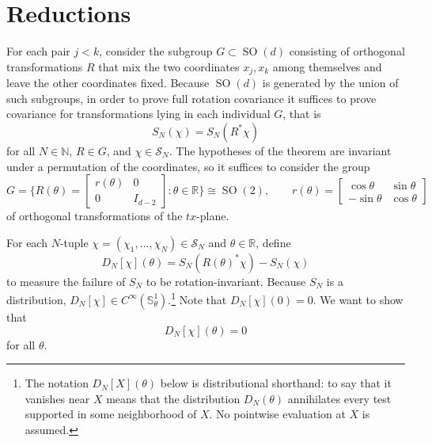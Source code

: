 \documentclass[11pt, letterpaper, reqno]{amsart}
\theoremstyle{definition}
\theoremstyle{remark}
\newcommand{\bbN}{\mathbb{N}}
\newcommand{\bbR}{\mathbb{R}}
\newcommand{\bbS}{\mathbb{S}}
\newcommand{\calS}{\mathcal{S}}
\begin{document}
\section{Reductions}


For each pair $j<k$, consider the subgroup $G\subset \operatorname{SO}(d)$ consisting of orthogonal transformations $R$ that mix the two coordinates $x_j,x_k$ among themselves and leave the other coordinates fixed.
Because $\operatorname{SO}(d)$ is generated by the union of such subgroups, in order to prove full rotation covariance it suffices to prove covariance for transformations lying in each individual $G$, that is
\begin{equation}
    S_N(\chi) = S_N(R^* \chi )
\end{equation}
for all $N\in \bbN$, $R\in G$, and $\chi\in \calS_N$. 
The hypotheses of the theorem are invariant under a permutation of the coordinates, so it suffices to consider the group
\begin{equation}
    G=\Bigg\{  R(\theta) =\begin{bmatrix} 
    r(\theta) & 0 \\
     0 & I_{d-2} 
    \end{bmatrix}  : \theta\in \bbR
    \Bigg\} \cong \operatorname{SO}(2),\qquad  r(\theta) = 
    \begin{bmatrix}
        \cos \theta & \sin \theta \\ 
        -\sin \theta & \cos \theta 
    \end{bmatrix}
\end{equation}
of orthogonal transformations of the $tx$-plane. 

For each $N$-tuple $\chi=(\chi_1,\dots,\chi_N)\in \calS_N$
and $\theta\in \bbR$, define 
\begin{equation}
    D_N[\chi](\theta) = 
    S_N (R(\theta)^* \chi) -S_N(\chi)
\end{equation}
to measure the failure of $S_N$ to be rotation-invariant. 
Because $S_N$ is a distribution, $D_N[\chi] \in C^\infty(\bbS^1_\theta)$.\footnote{The notation $D_N[X](\theta)$ below is distributional shorthand: to say that it vanishes near $X$ means that the distribution $D_N(\theta)$ annihilates every test supported in some neighborhood of $X$. No pointwise evaluation at $X$ is assumed.} Note that $D_N[\chi](0)=0$. We want to show that
\begin{equation}
    D_N[\chi](\theta)=0
\end{equation}
for all $\theta$. 
\end{document}
